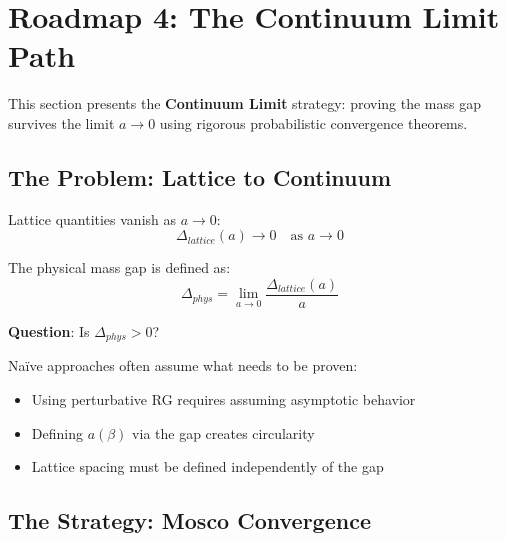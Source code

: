 \section{Roadmap 4: The Continuum Limit Path}
\label{sec:roadmap-continuum-limit}

This section presents the \textbf{Continuum Limit} strategy: proving the mass 
gap survives the limit $a \to 0$ using rigorous probabilistic convergence theorems.

\subsection{The Problem: Lattice to Continuum}

\begin{problem}
Lattice quantities vanish as $a \to 0$:
\begin{equation}
\Delta_{lattice}(a) \to 0 \quad \text{as } a \to 0
\end{equation}

The physical mass gap is defined as:
\begin{equation}
\Delta_{phys} = \lim_{a \to 0} \frac{\Delta_{lattice}(a)}{a}
\end{equation}

\textbf{Question}: Is $\Delta_{phys} > 0$?
\end{problem}

\begin{danger}
Na\"ive approaches often assume what needs to be proven:
\begin{itemize}
\item Using perturbative RG requires assuming asymptotic behavior
\item Defining $a(\beta)$ via the gap creates circularity
\item Lattice spacing must be defined independently of the gap
\end{itemize}
\end{danger}

\subsection{The Strategy: Mosco Convergence}

